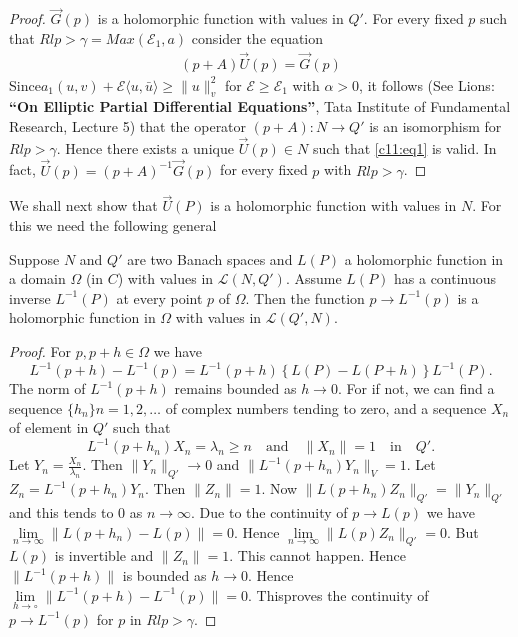 \begin{proof}
$\overrightarrow{G}(p)$ is a holomorphic function with values in
$Q'$. For every fixed $p$ such that $Rl p> \gamma = Max
(\mathscr{E}_1, a)$ consider the equation 
\begin{align*}
(p + A)\overrightarrow{U}(p) = \overrightarrow{G}(p)\tag{1}\label{c11:eq1}
\end{align*}
Since\pageoriginale $a_1(u, v)+\mathscr{E} \langle u, \bar{u}\rangle
\geq \parallel u \parallel_v^2$ for $\mathscr{E} \geq \mathscr{E}_1$
with $\alpha > 0$, it follows (See Lions: {\bf ``On Elliptic Partial
 Differential Equations''}, Tata Institute of Fundamental Research,
Lecture 5) that the operator $(p + A) : N \to Q'$ is an isomorphism
for $Rl p > \gamma$. Hence there exists a unique
$\overrightarrow{U}(p) \in N$ such that \eqref{c11:eq1} is valid. In fact,
$\overrightarrow{U}(p) = (p + A)^{-1} \overrightarrow{G}(p)$ for every
fixed $p$ with $Rl p > \gamma$.
\end{proof}

We shall next show that $\overrightarrow{U}(P)$ is a holomorphic
function with values in $N$. For this we need the following general

\begin{lemma*}
Suppose $N$ and $Q'$ are two Banach spaces and $L(P)$ a holomorphic
function in a domain $\Omega$ (in $C$) with values in $\mathscr{L}
(N,Q')$. Assume $L(P)$ has a continuous inverse $L^{-1}(P)$ at every
point $p$ of $\Omega$. Then the function $p \to L^{-1}(p)$ is a
holomorphic function in $\Omega$ with values in $\mathscr{L}(Q', N)$.  
\end{lemma*}

\begin{proof}
For $p, p+h \in \Omega$ we have
$$
L^{-1}(p+h)-L^{-1}(p) = L^{-1}(p+h) \left\{ L(P) - 
L(P+h)\right\} L^{-1}(P).
$$
The norm of $L^{-1}(p+h)$ remains bounded as $h \to 0$. For if not, 
we can find a sequence $\{h_n\} n = 1, 2, \ldots$ of complex numbers
tending to zero, and a sequence $X_n$ of element in $Q'$ such that 
$$
L^{-1}(p+h_n) X_n = \lambda_n \geq n \quad \text{and} \quad \parallel
X_n\parallel = 1\quad \text{in}\quad Q'.
$$
Let $Y_n = \frac{X_n}{\lambda_n}$. Then $\parallel Y_n \parallel_{Q'} \to
0$ and $\parallel L^{-1}(p+h_n)Y_n\parallel_V=1$. Let $Z_n =
L^{-1}(p+h_n)Y_n$. Then $\parallel Z_n\parallel = 1$. Now $\parallel
L(p+h_n)Z_n\parallel_{Q'}= \parallel Y_n\parallel_{Q'}$ and this tends
to $0$ as $n \to \infty$. Due to the continuity of $p \to L(p)$ we
have $\lim\limits_{n \to \infty}\parallel L(p+h_n) - L(p)\parallel =
0$. Hence $\lim\limits_{n \to \infty} \parallel L(p) Z_n \parallel_{Q'} =
0$. But $L(p)$ is invertible and $\parallel Z_n \parallel = 1$. This
cannot happen. Hence $\parallel L^{-1}(p+h) \parallel$ is bounded as
$h \to 0$. Hence $\lim\limits_{h \to \circ} \parallel L^{-1}(p+h) -
L^{-1}(p)\parallel = 0$. This\pageoriginale proves the continuity of
$p \to L^{-1}(p)$ for $p$ in $Rl p > \gamma$.
\end{proof}

